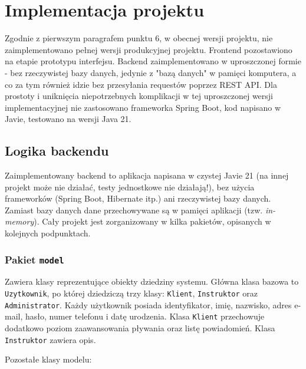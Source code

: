 \documentclass[a4paper,12pt]{article}
\begin{document}
\section{Implementacja projektu}

Zgodnie z pierwszym paragrafem punktu 6, w obecnej wersji projektu, nie zaimplementowano pełnej wersji produkcyjnej projektu. Frontend pozostawiono na etapie prototypu interfejsu. Backend zaimplementowano w uproszczonej formie - bez rzeczywistej bazy danych, jedynie z "bazą danych" w pamięci komputera, a co za tym również idzie bez przesyłania requestów poprzez REST API. Dla prostoty i uniknięcia niepotrzebnych komplikacji w tej uproszczonej wersji implementacyjnej nie zastosowano frameworka Spring Boot, kod napisano w Javie, testowano na wersji Java 21.

\subsection{Logika backendu}

Zaimplementowany backend to aplikacja napisana w czystej Javie 21 (na innej projekt może nie działać, testy jednostkowe nie działają!), bez użycia frameworków (Spring Boot, Hibernate itp.) ani rzeczywistej bazy danych. Zamiast bazy danych dane przechowywane są w pamięci aplikacji (tzw. \textit{in-memory}). Cały projekt jest zorganizowany w kilka pakietów, opisanych w kolejnych podpunktach.

\subsubsection*{Pakiet \texttt{model}}

Zawiera klasy reprezentujące obiekty dziedziny systemu. Główna klasa bazowa to \texttt{Uzytkownik}, po której dziedziczą trzy klasy: \texttt{Klient}, \texttt{Instruktor} oraz \texttt{Administrator}. Każdy użytkownik posiada identyfikator, imię, nazwisko, adres e-mail, hasło, numer telefonu i datę urodzenia. Klasa \texttt{Klient} przechowuje dodatkowo poziom zaawansowania pływania oraz listę powiadomień. Klasa \texttt{Instruktor} zawiera opis.

Pozostałe klasy modelu:
\end{document}
